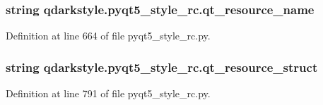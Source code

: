 \subsubsection[{qt\+\_\+resource\+\_\+name}]{\setlength{\rightskip}{0pt plus 5cm}string qdarkstyle.\+pyqt5\+\_\+style\+\_\+rc.\+qt\+\_\+resource\+\_\+name}\label{namespaceqdarkstyle_1_1pyqt5__style__rc_a207b67cf60ed1a26c50f0f0247dd3471}


Definition at line 664 of file pyqt5\+\_\+style\+\_\+rc.\+py.

\hypertarget{namespaceqdarkstyle_1_1pyqt5__style__rc_a5e793fe3bf217b3c4c828f6429af75b4}{}
\subsubsection[{qt\+\_\+resource\+\_\+struct}]{\setlength{\rightskip}{0pt plus 5cm}string qdarkstyle.\+pyqt5\+\_\+style\+\_\+rc.\+qt\+\_\+resource\+\_\+struct}\label{namespaceqdarkstyle_1_1pyqt5__style__rc_a5e793fe3bf217b3c4c828f6429af75b4}


Definition at line 791 of file pyqt5\+\_\+style\+\_\+rc.\+py.

